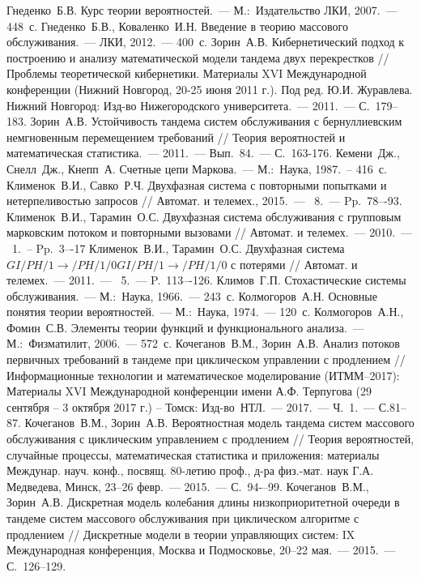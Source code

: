 \documentclass{report}
\newcommand{\No}{\textnumero}
\begin{document}
\begin{thebibliography}{99}
 Гнеденко~Б.В. Курс теории вероятностей.~--- М.:~Издательство ЛКИ, 2007.~--- 448~с.
 Гнеденко~Б.В., Коваленко~И.Н. Введение в теорию массового обслуживания.~--- ЛКИ, 2012.~--- 400~с.
 Зорин~А.В. Кибернетический подход к построению и анализу математической модели тандема двух перекрестков // Проблемы теоретической кибернетики. Материалы XVI Международной конференции (Нижний Новгород, 20-25 июня 2011 г.). Под ред. Ю.И. Журавлева. Нижний Новгород: Изд-во Нижегородского университета.~--- 2011.~--- С.~179--183.
 Зорин~А.В. Устойчивость тандема систем обслуживания с бернуллиевским немгновенным перемещением требований // Теория вероятностей и математическая статистика.~--- 2011.~--- Вып.~84.~--- С.~163-176.
 Кемени~Дж., Снелл~Дж., Кнепп~А. Счетные цепи Маркова.~--- М.:~Наука, 1987.~-- 416~с.
 Клименок~В.И., Савко~Р.Ч. Двухфазная система с повторными попытками и нетерпеливостью запросов // Автомат. и телемех., 2015.~--- \No{}~8.~--- Pp.~78–-93. 
 Клименок~В.И., Тарамин~О.С. Двухфазная система обслуживания с групповым марковским потоком и повторными вызовами // Автомат. и телемех.~--- 2010.~--- \No~1.~-- Pp.~3–-17 
 Клименок~В.И., Тарамин~О.С. Двухфазная система $GI/PH/1 \to /PH/1/0GI/PH/1 \to /PH/1/0$ с потерями // Автомат. и телемех.~--- 2011.~--- \No{}~5.~--- P.~113–-126.
 Климов~Г.П. Стохастические системы обслуживания.~--- М.:~Наука, 1966.~--- 243~с.
 Колмогоров~А.Н. Основные понятия теории вероятностей.~--- М.:~Наука, 1974.~--- 120~с.
 Колмогоров~А.Н., Фомин~С.В. Элементы теории функций и функционального анализа.~--- М.:~Физматилит, 2006.~--- 572~с.
 Кочеганов~В.М., Зорин~А.В. Анализ потоков первичных требований в тандеме при циклическом управлении с продлением // Информационные технологии и математическое моделирование (ИТММ--2017): Материалы XVI Международной конференции имени А.Ф. Терпугова (29 сентября -- 3 октября 2017 г.) -- Томск: Изд-во~НТЛ.~--- 2017.~--- Ч.~1.~--- С.81--87.
 Кочеганов~В.М., Зорин~А.В. Вероятностная модель тандема систем массового обслуживания с циклическим управлением с продлением // Теория вероятностей, случайные процессы, математическая статистика и приложения: материалы Междунар. науч. конф., посвящ. 80-летию проф., д-ра физ.-мат. наук Г.А. Медведева, Минск, 23–26 февр.~--- 2015.~--- С.~94-–99.
 Кочеганов~В.М., Зорин~А.В. Дискретная модель колебания длины низкоприоритетной очереди в тандеме систем массового обслуживания при циклическом алгоритме с продлением // Дискретные модели в теории управляющих систем: IX Международная конференция, Москва и Подмосковье, 20–22 мая.~--- 2015.~--- С.~126--129.

\end{thebibliography}
\end{document}
